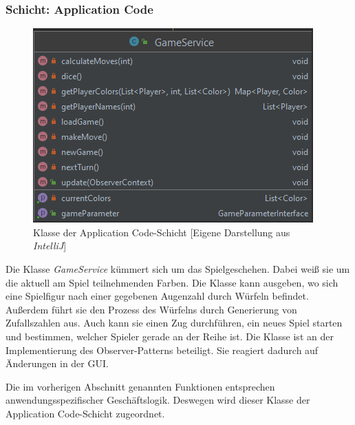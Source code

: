 \subsubsection{Schicht: Application Code}
\begin{figure}[htbp]
\centering
\centerline{\includegraphics[scale=.55]{gameservice}}
\caption{Klasse der Application Code-Schicht [Eigene Darstellung aus \emph{IntelliJ}]}
\label{fig:klasseapplicationcodeschicht}
\end{figure}
\noindent Die Klasse \emph{GameService} kümmert sich um das Spielgeschehen. Dabei weiß sie um die aktuell am Spiel teilnehmenden Farben. Die Klasse kann ausgeben, wo sich eine Spielfigur nach einer gegebenen Augenzahl durch Würfeln befindet. Außerdem führt sie den Prozess des Würfelns durch Generierung von Zufallszahlen aus. Auch kann sie einen Zug durchführen, ein neues Spiel starten und bestimmen, welcher Spieler gerade an der Reihe ist. Die Klasse ist an der Implementierung des Observer-Patterns beteiligt. Sie reagiert dadurch auf Änderungen in der GUI.

Die im vorherigen Abschnitt genannten Funktionen entsprechen anwendungsspezifischer Geschäftslogik. Deswegen wird dieser Klasse der Application Code-Schicht zugeordnet.